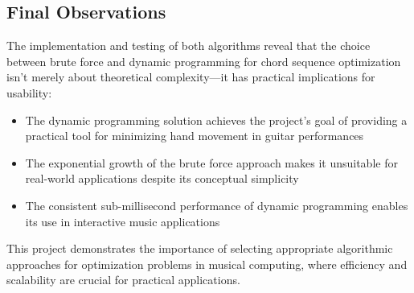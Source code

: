 \documentclass[conference]{IEEEtran}
\begin{document}
\subsection{Final Observations}
The implementation and testing of both algorithms reveal that the choice between brute force and dynamic programming for chord sequence optimization isn't merely about theoretical complexity—it has practical implications for usability:

\begin{itemize}
    \item The dynamic programming solution achieves the project's goal of providing a practical tool for minimizing hand movement in guitar performances
    \item The exponential growth of the brute force approach makes it unsuitable for real-world applications despite its conceptual simplicity
    \item The consistent sub-millisecond performance of dynamic programming enables its use in interactive music applications
\end{itemize}

This project demonstrates the importance of selecting appropriate algorithmic approaches for optimization problems in musical computing, where efficiency and scalability are crucial for practical applications.



\end{document}
